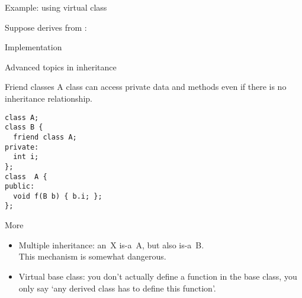 \begin{block}{Example: using virtual class}
  \small
  \begin{multicols}{2}
    \vfill\columnbreak
    Suppose  derives from :\\
  \end{multicols}
\end{block}

\begin{block}{Implementation}
  \footnotesize
  \begin{multicols}{2}
    \vfill\columnbreak
  \end{multicols}
\end{block}

 {Advanced topics in inheritance}

\begin{block}{Friend classes}
  \label{sl:obj-friend}
  A  class can access private data and methods
  even if there is no inheritance relationship.
\begin{lstlisting}
class A;
class B {
  friend class A;
private:
  int i;
};
class  A {
public: 
  void f(B b) { b.i; };
};
\end{lstlisting}
\end{block}

\begin{block}{More}
  \label{sl:obj-more}  
  \begin{itemize}
  \item  Multiple inheritance: an~X is-a~A, but also is-a~B.\\
    This mechanism is somewhat dangerous.
  \item Virtual base class: you don't actually define a function in
    the base class, you only say `any derived class has to define this
    function'.
  \end{itemize}
\end{block}

